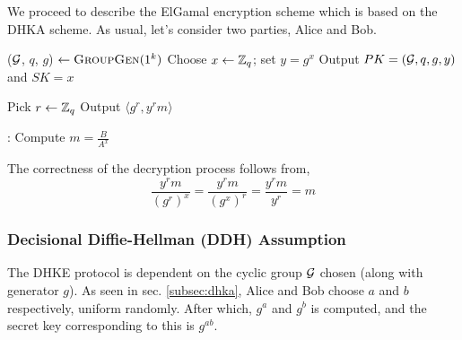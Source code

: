 We proceed to describe the ElGamal encryption scheme which is based on the DHKA scheme. As usual, let's consider two parties, Alice and Bob.



\smallskip


\begin{algorithmic}
\STATE ($ \mathcal{G} $, $ q $, $ g $) $ \leftarrow \textsc{GroupGen} (1^k) $ 
\STATE Choose $ x \leftarrow \mathbb{Z}_q $; set $ y = g^x $ 
\STATE Output $ PK = ( \mathcal{G}, q, g, y) $ and $ SK = x $ 
\end{algorithmic} 

\smallskip

\begin{algorithmic}
\STATE Pick $ r \leftarrow \mathbb{Z}_q $ 
\STATE Output $ \langle g^r, y^r m \rangle $ 
\end{algorithmic} 

\smallskip

\begin{algorithmic}
:
\STATE Compute $ m = \frac{B}{A^x} $ 
\end{algorithmic}

The correctness of the decryption process follows from,
\begin{equation*}
\frac{y^r m}{(g^r)^x} = \frac{y^r m}{(g^x)^r} = \frac{y^r m }{y^r} = m
\end{equation*}

\subsubsection{Decisional Diffie-Hellman (DDH) Assumption}

The DHKE protocol is dependent on the cyclic group \( \mathcal{G} \) chosen (along with generator \( g \)).
As seen in sec. \ref{subsec:dhka}, Alice and Bob choose \( a \) and \( b \) respectively, uniform randomly. 
After which, \( g^a \) and \( g^b \) is computed, and the secret key corresponding to this is \( g^{ab} \).

